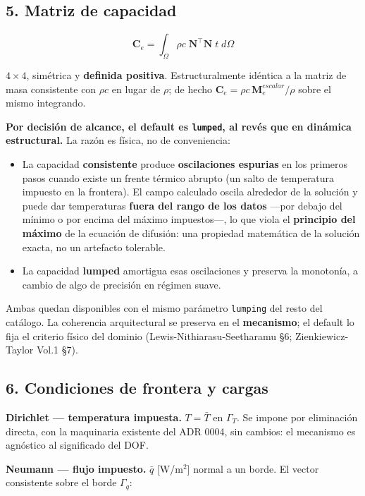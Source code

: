 \documentclass[11pt,letterpaper,oneside]{report}
\begin{document}
\subsection{5. Matriz de capacidad}

\[
\mathbf C_e = \int_\Omega \rho c\;\mathbf N^\top\mathbf N\;t\;d\Omega
\]

$4\times4$, simétrica y \textbf{definida positiva}. Estructuralmente idéntica a la matriz de masa consistente con $\rho c$ en lugar de $\rho$; de hecho $\mathbf C_e = \rho c\,\mathbf M_e^{escalar}/\rho$ sobre el mismo integrando.

\textbf{Por decisión de alcance, el default es \texttt{lumped}, al revés que en dinámica estructural.} La razón es física, no de conveniencia:

\begin{itemize}
  \item La capacidad \textbf{consistente} produce \textbf{oscilaciones espurias} en los primeros pasos cuando existe un frente térmico abrupto (un salto de temperatura impuesto en la frontera). El campo calculado oscila alrededor de la solución y puede dar temperaturas \textbf{fuera del rango de los datos} ---por debajo del mínimo o por encima del máximo impuestos---, lo que viola el \textbf{principio del máximo} de la ecuación de difusión: una propiedad matemática de la solución exacta, no un artefacto tolerable.
  \item La capacidad \textbf{lumped} amortigua esas oscilaciones y preserva la monotonía, a cambio de algo de precisión en régimen suave.
\end{itemize}

Ambas quedan disponibles con el mismo parámetro \texttt{lumping} del resto del catálogo. La coherencia arquitectural se preserva en el \textbf{mecanismo}; el default lo fija el criterio físico del dominio (Lewis-Nithiarasu-Seetharamu §6; Zienkiewicz-Taylor Vol.1 §7).

\subsection{6. Condiciones de frontera y cargas}

\textbf{Dirichlet --- temperatura impuesta.} $T = \bar T$ en $\Gamma_T$. Se impone por eliminación directa, con la maquinaria existente del ADR 0004, sin cambios: el mecanismo es agnóstico al significado del DOF.

\textbf{Neumann --- flujo impuesto.} $\bar q$ [W/m\ensuremath{^{2}}] normal a un borde. El vector consistente sobre el borde $\Gamma_q$:
\end{document}
